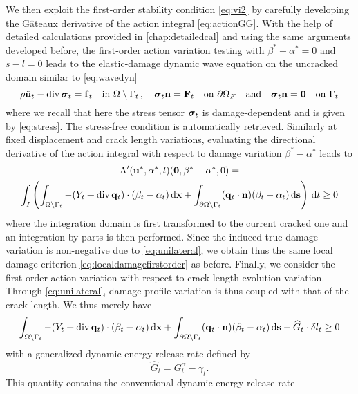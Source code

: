 We then exploit the first-order stability condition \eqref{eq:vi2} by carefully developing the Gâteaux derivative of the action integral \eqref{eq:actionGG}. With the help of detailed calculations provided in \cref{chap:detailedcal} and using the same arguments developed before, the first-order action variation testing with $\beta^*-\alpha^*=0$ and $s-l=0$ leads to the elastic-damage dynamic wave equation on the uncracked domain similar to \eqref{eq:wavedyn}
\begin{equation} \label{eq:waveequation}
\rho\ddot{\vec{u}}_t-\div\sig_t=\vec{f}_t\quad\text{in }\domaint\,,\quad\sig_t\vec{n}=\vec{F}_t\quad\text{on }\partial\Omega_F\quad\text{and}\quad\sig_t\vec{n}=\vec{0}\quad\text{on }\Gamma_t
\end{equation}
where we recall that here the stress tensor $\sig_t$ is damage-dependent and is given by \eqref{eq:stress}. The stress-free condition is automatically retrieved. Similarly at fixed displacement and crack length variations, evaluating the directional derivative of the action integral with respect to damage variation $\beta^*-\alpha^*$ leads to
\begin{multline*}
\mathrm{A}'(\vec{u}^*,\alpha^*,l)(\vec{0},\beta^*-\alpha^*,0)= \\
\int_I\left(\int_\domaint-(Y_t+\div\vec{q}_t)\cdot(\beta_t-\alpha_t)\dx+\int_{\partial\Omega\setminus\Gamma_t}(\vec{q}_t\cdot\vec{n})(\beta_t-\alpha_t)\ds\right)\D{t}\geq 0
\end{multline*}
where the integration domain is first transformed to the current cracked one and an integration by parts is then performed. Since the induced true damage variation is non-negative due to \eqref{eq:unilateral}, we obtain thus the same local damage criterion \eqref{eq:localdamagefirstorder} as before. Finally, we consider the first-order action variation with respect to crack length evolution variation. Through \eqref{eq:unilateral}, damage profile variation is thus coupled with that of the crack length. We thus merely have
\begin{equation} \label{eq:staball}
\int_\domaint-(Y_t+\div\vec{q}_t)\cdot(\beta_t-\alpha_t)\dx+\int_{\partial\Omega\setminus\Gamma_t}(\vec{q}_t\cdot\vec{n})(\beta_t-\alpha_t)\ds-\widehat{G}_t\cdot\delta l_t\geq 0
\end{equation}
with a generalized dynamic energy release rate defined by
\begin{equation} \label{eq:GtG}
\widehat{G}_t=G_t^\alpha-\gamma_t.
\end{equation}
This quantity contains the conventional dynamic energy release rate
